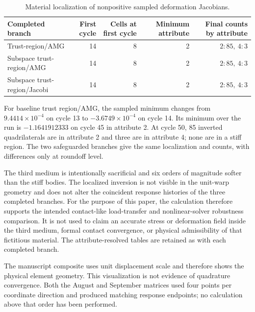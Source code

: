 \documentclass[11pt]{article}
\begin{document}
\begin{table}[h]
  \centering
  \small
  \caption{Material localization of nonpositive sampled deformation Jacobians.}
  \begin{tabular}{@{}lrrrr@{}}
    \toprule
    Completed branch & First cycle & Cells at first cycle & Minimum attribute & Final counts by attribute \\
    \midrule
    Trust-region/AMG & 14 & 8 & 2 & $2{:}85,\ 4{:}3$ \\
    Subspace trust-region/AMG & 14 & 8 & 2 & $2{:}85,\ 4{:}3$ \\
    Subspace trust-region/Jacobi & 14 & 8 & 2 & $2{:}85,\ 4{:}3$ \\
    \bottomrule
  \end{tabular}
\end{table}

For baseline trust region/AMG, the sampled minimum changes from
$9.4414\times10^{-4}$ on cycle 13 to $-3.6749\times10^{-4}$ on cycle 14.  Its
minimum over the run is $-1.1641912333$ on cycle 45 in attribute 2.  At cycle 50,
85 inverted quadrilaterals are in attribute 2 and three are in attribute 4; none
are in a stiff region.  The two safeguarded branches give the same localization
and counts, with differences only at roundoff level.

The third medium is intentionally sacrificial and six orders of magnitude softer
than the stiff bodies.  The localized inversion is not visible in the unit-warp
geometry and does not alter the coincident response histories of the three
completed branches.  For the purpose of this paper, the calculation therefore
supports the intended contact-like load-transfer and nonlinear-solver robustness
comparison.  It is not used to claim an accurate stress or deformation field
inside the third medium, formal contact convergence, or physical admissibility of
that fictitious material.  The attribute-resolved tables are retained as
 with each completed branch.

The manuscript composite uses unit displacement scale and therefore shows the
physical element geometry.  This visualization is not evidence of quadrature
convergence. Both the August and September matrices used four points per
coordinate direction and produced matching response endpoints; no calculation
above that order has been performed.
\end{document}
